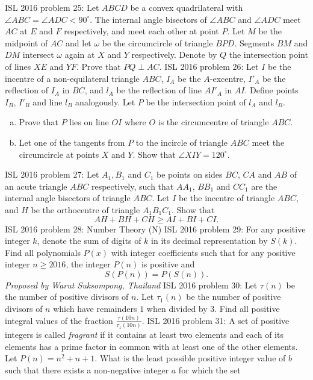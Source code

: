 ISL 2016 problem 25:  Let $ABCD$ be a convex quadrilateral with $\angle ABC = \angle ADC < 90^{\circ}$. The internal angle bisectors of $\angle ABC$ and $\angle ADC$ meet $AC$ at $E$ and $F$ respectively, and meet each other at point $P$. Let $M$ be the midpoint of $AC$ and let $\omega$ be the circumcircle of triangle $BPD$. Segments $BM$ and $DM$ intersect $\omega$ again at $X$ and $Y$ respectively. Denote by $Q$ the intersection point of lines $XE$ and $YF$. Prove that $PQ \perp AC$. 
ISL 2016 problem 26:  Let $I$ be the incentre of a non-equilateral triangle $ABC$, $I_A$ be the $A$-excentre, $I'_A$ be the reflection of $I_A$ in $BC$, and $l_A$ be the reflection of line $AI'_A$ in $AI$. Define points $I_B$, $I'_B$ and line $l_B$ analogously. Let $P$ be the intersection point of $l_A$ and $l_B$.
\begin{enumerate}[a.]
  \item Prove that $P$ lies on line $OI$ where $O$ is the circumcentre of triangle $ABC$.
  \item Let one of the tangents from $P$ to the incircle of triangle $ABC$ meet the circumcircle at points $X$ and $Y$. Show that $\angle XIY = 120^{\circ}$.
\end{enumerate} 
ISL 2016 problem 27:  Let $A_1, B_1$ and $C_1$ be points on sides $BC$, $CA$ and $AB$ of an acute triangle $ABC$ respectively, such that $AA_1$, $BB_1$ and $CC_1$ are the internal angle bisectors of triangle $ABC$. Let $I$ be the incentre of triangle $ABC$, and $H$ be the orthocentre of triangle $A_1B_1C_1$. Show that
\[ AH + BH + CH \geq AI + BI + CI. \] 
ISL 2016 problem 28:  Number Theory (N) 
ISL 2016 problem 29:  For any positive integer $k$, denote the sum of digits of $k$ in its decimal representation by $S(k)$. Find all polynomials $P(x)$ with integer coefficients such that for any positive integer $n \geq 2016$, the integer $P(n)$ is positive and
\[ S(P(n)) = P(S(n)). \]
\textit{Proposed by Warut Suksompong, Thailand} 
ISL 2016 problem 30:  Let $\tau(n)$ be the number of positive divisors of $n$. Let $\tau_1(n)$ be the number of positive divisors of $n$ which have remainders $1$ when divided by $3$. Find all positive integral values of the fraction $\frac{\tau(10n)}{\tau_1(10n)}$. 
ISL 2016 problem 31:  A set of positive integers is called \textit{fragrant} if it contains at least two elements and each of its elements has a prime factor in common with at least one of the other elements.  Let $P(n)=n^2+n+1$.  What is the least possible positive integer value of $b$ such that there exists a non-negative integer $a$ for which the set
